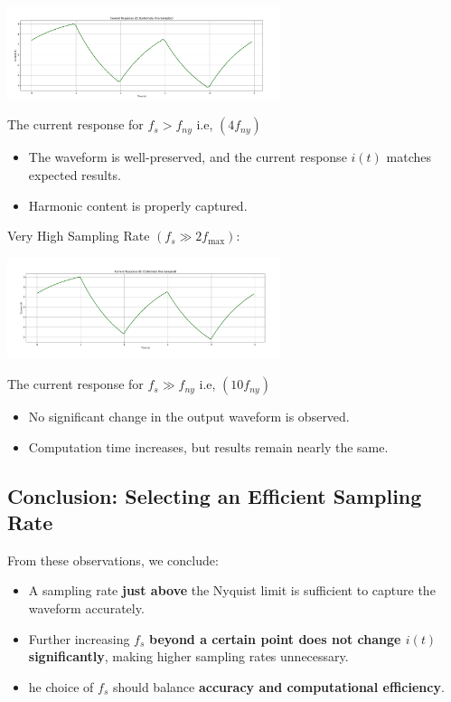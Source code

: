 \documentclass[journal]{IEEEtran}
\begin{document}
      \captionsetup{type=figure}
    \centering
    \includegraphics[width=0.6\textwidth]{Nyquist_samples/4_f_ny}
    \caption{The current response for  $f_s > f_{ny}$   i.e, $(4f_{ny})$}
    \label{fig:example}
    \begin{itemize}
        \item The waveform is well-preserved, and the current response $i(t)$ matches expected results.
        \item Harmonic content is properly captured.
    \end{itemize}
    \begin{center} 
     Very High Sampling Rate $(f_s \gg 2 f_{\max}):$
    \end{center}
     \captionsetup{type=figure}
    \centering
    \includegraphics[width=0.6\textwidth]{Nyquist_samples/10_f_ny}
    \caption{The current response for  $f_s \gg f_{ny}$   i.e, $(10 f_{ny})$}
    \label{fig:example}
    \begin{itemize}
        \item 	No significant change in the output waveform is observed.
        \item Computation time increases, but results remain nearly the same.
    \end{itemize}
    
\subsection{Conclusion: Selecting an Efficient Sampling Rate}
      From these observations, we conclude:
    \begin{itemize}
        \item A sampling rate \textbf{just above} the Nyquist limit is sufficient to capture the waveform accurately.
        \item Further increasing $f_s$ \textbf{beyond a certain point does not change $i(t)$ significantly}, making higher sampling rates unnecessary.
        \item he choice of $f_s$ should balance \textbf{accuracy and computational efficiency}.
    \end{itemize}
\end{document}
